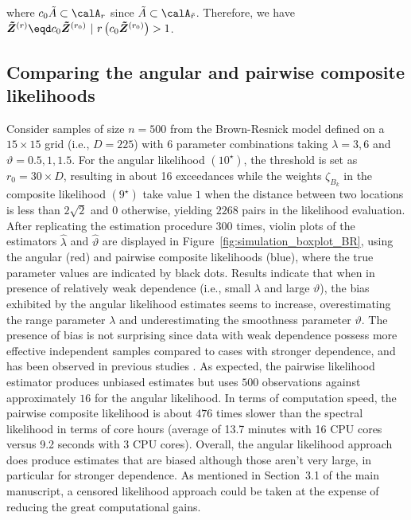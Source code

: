 \documentclass[12pt]{article}
\begin{document}
    where $c_0\tilde A\subset \calA_{r}$ since $\tilde A\subset \calA_{\tilde r}$. Therefore, we have $\bm{\tilde Z}^{(r)}\eqd c_0\bm{\tilde Z}^{(r_0)}\ | \ r\left(c_0\bm{\tilde Z}^{(r_0)}\right) > 1 $.


\subsection{Comparing the angular and pairwise composite likelihoods}

Consider samples of size $n=500$ from the Brown-Resnick model defined on a $15\times15$ grid (i.e., $D=225$) with $6$ parameter combinations taking  $\lambda=3,6$ and $\vartheta=0.5,1,1.5$. 
%
For the angular likelihood $(10^\star)$, the threshold is set as $r_0=30\times D$, resulting in about 16 exceedances while the weights $\zeta_{B_k}$ in the composite likelihood $(9^\star)$ take value $1$ when the distance between two locations is less than $2\sqrt{2}$ and $0$ otherwise, yielding $2268$ pairs in the likelihood evaluation.
%
After replicating the estimation procedure $300$ times, violin plots of the estimators  $\hat\lambda$ and $\hat\vartheta$ are displayed in Figure~\ref{fig:simulation_boxplot_BR}, using the angular (red) and pairwise composite likelihoods (blue), where the true parameter values are indicated by black dots. 
%
Results indicate that when in presence of relatively weak dependence (i.e., small $\lambda$ and large $\vartheta$), the bias exhibited by the angular likelihood  estimates seems to increase, overestimating the range parameter $\lambda$ and underestimating the smoothness parameter $\vartheta$. 
%
The presence of bias is not surprising since data with weak dependence possess more effective independent samples compared to cases with stronger dependence, and has been observed in previous studies \citep[see e.g.][]{Engelke.etal:2015, Huser.etal:2016}. 
%
As expected, the pairwise likelihood estimator produces unbiased estimates but uses $500$ observations against approximately $16$ for the angular likelihood.
%
In terms of computation speed, the pairwise composite likelihood is about $476$ times slower than the spectral likelihood in terms of core hours (average of 13.7 minutes with 16 CPU cores versus 9.2 seconds with 3 CPU cores).
%
Overall, the angular likelihood approach does produce estimates that are biased although those aren't very large, in particular for stronger dependence. As mentioned in Section~3.1 of the main manuscript, a censored likelihood approach could be taken at the expense of reducing the great computational gains.
\end{document}
